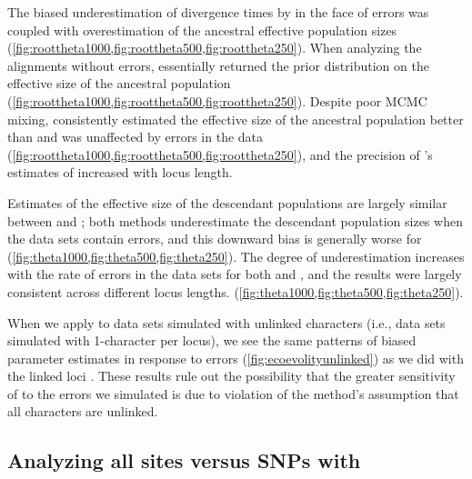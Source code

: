 The biased underestimation of divergence times by \ecoevolity in the face of
errors was coupled with overestimation of the ancestral effective population
sizes (\cref{fig:roottheta1000,fig:roottheta500,fig:roottheta250}).
When analyzing the alignments without errors, \ecoevolity essentially returned
the prior distribution on the effective size of the ancestral population
(\cref{fig:roottheta1000,fig:roottheta500,fig:roottheta250}).
Despite poor MCMC mixing,
\beast consistently estimated the effective size of
the ancestral population better than \ecoevolity and was unaffected by errors
in the data
(\cref{fig:roottheta1000,fig:roottheta500,fig:roottheta250}),
and the precision of \beast{}'s estimates of \rootpopsize increased with locus
length.

Estimates of the effective size of the descendant populations
are largely similar between \beast and \ecoevolity;
both methods underestimate the descendant population sizes when
the data sets contain errors, and this downward bias is generally
worse for \ecoevolity
(\cref{fig:theta1000,fig:theta500,fig:theta250}).
The degree of underestimation increases with the rate of errors in the data
sets for both \beast and \ecoevolity, and the results were largely consistent
across different locus lengths.
(\cref{fig:theta1000,fig:theta500,fig:theta250}).

When we apply \ecoevolity to data sets simulated with unlinked characters
(i.e., data sets simulated with 1-character per locus),
we see the same patterns of biased parameter estimates
in response to errors
(\cref{fig:ecoevolityunlinked})
as we did with the linked loci \timefigsp.
These results rule out the possibility that the greater sensitivity of
\ecoevolity to the errors we simulated is due to violation of the method's
assumption that all characters are unlinked.

\subsection{Analyzing all sites versus SNPs with \ecoevolity}

